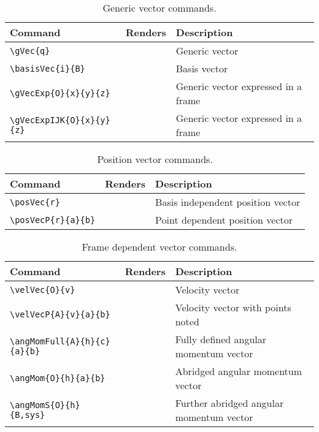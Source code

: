 \documentclass{article}
\begin{document}
	\begin{table}[h!]
		\caption{Generic vector commands.}
		\begin{tabular}[]{ p{1.75in} | p{1.25in} | p{3in} }	
			\hline	
			\textbf{Command} & \textbf{Renders} & \textbf{Description} \\ 
			\hline
			\verb|\gVec{q}| & \gVec{q} & Generic vector \\  
			\verb|\basisVec{i}{B}| & \basisVec{i}{B} & Basis vector \\
			\verb|\gVecExp{O}{x}{y}{z}| & \gVecExp{O}{x}{y}{z} & Generic vector expressed in a frame \\
			\verb|\gVecExpIJK{O}{x}{y}{z}| & \gVecExpIJK{O}{x}{y}{z} & Generic vector expressed in a frame \\
			\hline		
		\end{tabular}
	\end{table}
	
	\begin{table}[h!]
		\caption{Position vector commands.}
		\begin{tabular}[]{ p{1.75in} | p{1.25in} | p{3in} }	
			\hline	
			\textbf{Command} & \textbf{Renders} & \textbf{Description} \\ 
			\hline
			\verb|\posVec{r}| & \posVec{r} & Basis independent position vector \\  
			\verb|\posVecP{r}{a}{b}| & \posVecP{r}{a}{b} & Point dependent position vector \\
			\hline		
		\end{tabular}
	\end{table}
	
	\begin{table}[h!]
		\caption{Frame dependent vector commands.}
		\begin{tabular}[]{ p{2in} | p{1.0in} | p{3in} }	
			\hline	
			\textbf{Command} & \textbf{Renders} & \textbf{Description} \\ 
			\hline
			\verb|\velVec{O}{v}| & \velVec{O}{v} & Velocity vector \\
			\verb|\velVecP{A}{v}{a}{b}| & \velVecP{A}{v}{a}{b} & Velocity vector with points noted \\
			\verb|\angMomFull{A}{h}{c}{a}{b}| & \angMomFull{A}{h}{c}{a}{b} & Fully defined angular momentum vector \\
			\verb|\angMom{O}{h}{a}{b}| & \angMom{O}{h}{a}{b} & Abridged angular momentum vector \\
			\verb|\angMomS{O}{h}{B,sys}| & \angMomS{O}{h}{B,sys} & Further abridged angular momentum vector \\
			\hline		
		\end{tabular}
	\end{table}
	
	
\end{document}
